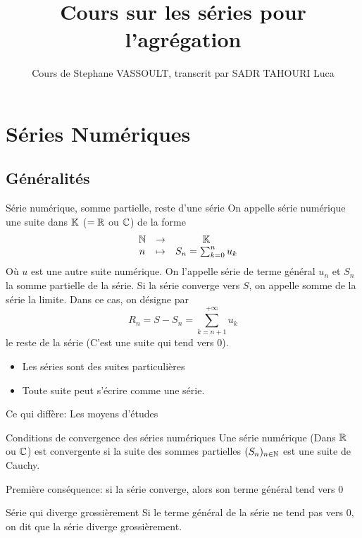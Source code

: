 \documentclass[]{report}
\title{Cours sur les séries pour l'agrégation}
\author{Cours de Stephane VASSOULT, transcrit par SADR TAHOURI Luca}
\date{}
\begin{document}
\maketitle
\tableofcontents

\chapter{Séries Numériques}

\section{Généralités}

\begin{df}{Série numérique, somme partielle, reste d'une série}{}
    On appelle série numérique une suite dans $\mathbb{K}$ ($=\mathbb{R}$ ou $\mathbb{C}$) de la forme
    \[\begin{array}{ccccc} & \mathbb{N} & \to & \mathbb{K} \\ & n & \mapsto & S_n=\sum_{k=0}^{n}u_k \end{array}\]
    Où $u$ est une autre suite numérique. On l'appelle série de terme général $u_n$ et $S_n$ la somme partielle de la série. Si la série converge vers $S$, on appelle somme de la série la limite. Dans ce cas, on désigne par
    \[R_n=S-S_n=\sum_{k=n+1}^{+\infty}u_k\]
    le reste de la série (C'est une suite qui tend vers $0$).
\end{df}

\begin{re}{}{}
    \begin{itemize}
        \item Les séries sont des suites particulières
        \item Toute suite peut s'écrire comme une série.
    \end{itemize}
    Ce qui diffère: Les moyens d'études
\end{re}

\begin{prop}{Conditions de convergence des séries numériques}{}
    Une série numérique (Dans $\mathbb{R}$ ou $\mathbb{C}$) est convergente si la suite des sommes partielles $(S_n)_{n\in\mathbb{N}}$ est une suite de Cauchy.
\end{prop}

\begin{cor}{}{}
    Première conséquence: si la série converge, alors son terme général tend vers $0$
\end{cor}

\begin{df}{Série qui diverge grossièrement}{}
    Si le terme général de la série ne tend pas vers $0$, on dit que la série diverge grossièrement.
\end{df}
\end{document}

